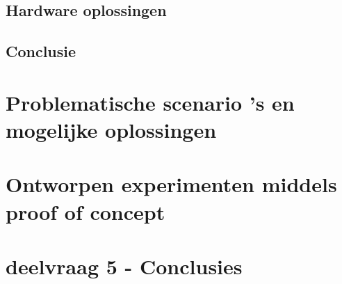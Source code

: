 \subsection{Hardware oplossingen}
\label{sec:hardware}

\clearpage

\subsection{Conclusie}
\label{sec:gevonden_tools}



\clearpage

\section{Problematische scenario 's en mogelijke oplossingen}
\label{sec:deelvraag3}

\clearpage

\section{Ontworpen experimenten middels proof of concept}
\label{sec:deelvraag4}

\clearpage

\section{deelvraag 5 - Conclusies}
\label{sec:deelvraag5}

